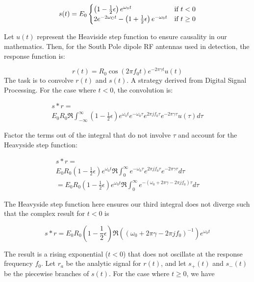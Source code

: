 \documentclass[amsmath,amssymb,aps,prd,10pt,twocolumn,showkeys]{revtex4}
\begin{document}
\begin{equation}
s(t) = E_0
\begin{cases}
\left(1-\frac{1}{2}\epsilon\right) e^{\omega_0 t} & \text{if } t < 0 \\
2e^{-2\omega_{\rm C}t} - \left(1+\frac{1}{2}\epsilon\right)e^{-\omega_0 t}  & \text{if } t \ge 0 \label{eq:1}
\end{cases}
\end{equation}

Let $u(t)$ represent the Heaviside step function to ensure causality in our mathematics. Then, for the South Pole dipole RF antennas used in detection, the response function is:

\begin{equation}
r(t) = R_0 \cos(2\pi f_0 t) e^{-2\pi\gamma t} u(t) \label{eq:2}
\end{equation}
The task is to convolve $r(t)$ and $s(t)$. A strategy derived from Digital Signal Processing.  For the case where $t<0$, the convolution is:

\begin{multline}
s * r = \\ E_0 R_0 \Re\int_{-\infty}^{\infty}\left(1-\frac{1}{2}\epsilon\right)e^{\omega_0t}e^{-\omega_0\tau}e^{2\pi jf_0\tau}e^{-2\pi\gamma\tau}u(\tau)d\tau
\end{multline}

Factor the terms out of the integral that do not involve $\tau$ and account for the Heavyside step function:

\begin{multline}
s * r = \\ E_0 R_0 \left(1-\frac{1}{2}\epsilon\right)e^{\omega_0t}\Re\int_{0}^{\infty}e^{-\omega_0\tau}e^{2\pi jf_0\tau}e^{-2\pi\gamma\tau}d\tau
\\ = E_0 R_0 \left(1-\frac{1}{2}\epsilon\right)e^{\omega_0t}\Re\int_{0}^{\infty}e^{-(\omega_0+2\pi\gamma-2\pi jf_0)\tau}d\tau
\end{multline}

The Heavyside step function here ensures our third integral does not diverge such that the complex result for $t<0$ is

\begin{equation}
s * r =  E_0 R_0 \left(1-\frac{1}{2}\epsilon\right)\Re((\omega_0+2\pi\gamma-2\pi jf_0)^{-1})e^{\omega_0t}
\end{equation}

The result is a rising exponential ($t<0$) that does not oscillate at the response frequency $f_0$.  Let $r_a$ be the analytic signal for $r(t)$, and let $s_+(t)$ and $s_-(t)$ be the piecewise branches of $s(t)$.  For the case where $t\ge 0$, we have
\end{document}
